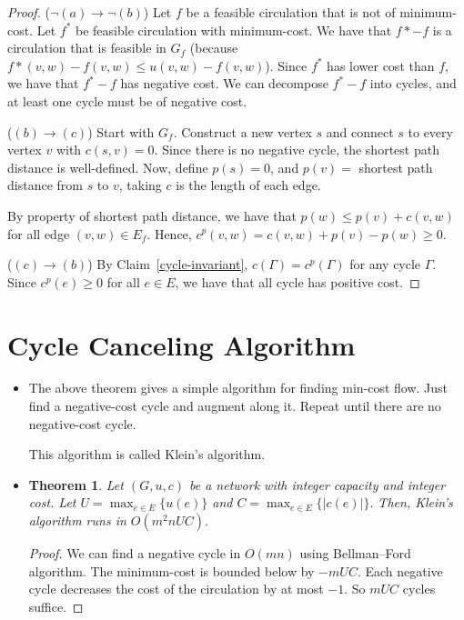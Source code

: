 \documentclass[10pt]{article}
\newtheorem{theorem}[lemma]{Theorem}
\begin{document}
\begin{itemize}
\begin{proof}
        ($\neg(a) \rightarrow \neg(b)$) Let $f$ be a feasible circulation that is not of minimum-cost.
          Let $f^*$ be feasible circulation with minimum-cost. We have that $f* - f$ is a circulation
          that is feasible in $G_f$ (because $f*(v,w) - f(v,w) \leq u(v,w) - f(v,w)$).
          Since $f^*$ has lower cost than $f$, we have that $f^* -f$ has negative cost.
          We can decompose $f^* - f$ into cycles, and at least one cycle must be of negative cost.
          \medskip
          
        ($(b) \rightarrow (c)$) Start with $G_f$. Construct a new vertex $s$ 
          and connect $s$ to every vertex $v$ with $c(s,v) = 0.$ 
          Since there is no negative cycle, the shortest path distance is well-defined.
          Now, define $p(s) = 0$, and $p(v) =$ shortest path distance from $s$ to $v$, 
          taking $c$ is the length of each edge.
          
          By property of shortest path distance, we have that $p(w) \leq p(v) + c(v,w)$
          for all edge $(v,w) \in E_f$. Hence, $c^p(v,w) = c(v,w) + p(v) - p(w) \geq 0.$ \medskip
          
        ($(c) \rightarrow (b)$) By Claim~\ref{cycle-invariant}, $c(\Gamma) = c^p(\Gamma)$
         for any cycle $\Gamma$. Since $c^p(e) \geq 0$ for all $e \in E$, we have
         that all cycle has positive cost.
      \end{proof}
  \end{itemize}
  
  \section{Cycle Canceling Algorithm} %
  \label{sec:cycle_canceling_algorithm}
    \begin{itemize}
      \item The above theorem gives a simple algorithm for finding min-cost flow.
        Just find a negative-cost cycle and augment along it. Repeat until
        there are no negative-cost cycle.
        
        This algorithm is called Klein's algorithm.
      
      \item
        \begin{theorem}
          Let $(G, u, c)$ be a network with integer capacity and integer cost.
          Let $U = \max_{e \in E} \{ u(e) \}$ and $C = \max_{e \in E} \{ |c(e)| \}.$
          Then, Klein's algorithm runs in $O(m^2nUC).$
        \end{theorem}
        
        \begin{proof}
          We can find a negative cycle in $O(mn)$ using Bellman--Ford algorithm.
          The minimum-cost is bounded below by $-mUC.$ Each negative cycle
          decreases the cost of the circulation by at most $-1$. So $mUC$ cycles
          suffice.
        \end{proof}
    \end{itemize}
  
\end{document}
